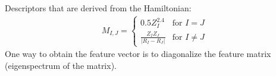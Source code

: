 Descriptors that are derived from the Hamiltonian:
\begin{align*}
M_{I,J} = 
\begin{cases}
0.5Z_{I}^{2.4}& \text{for } I = J \\
\frac{Z_{I}Z_{J}}{|R_I-R_J|}&  \text{for } I \neq J
\end{cases}
\end{align*}
One way to obtain the feature vector is to diagonalize the feature matrix (eigenspectrum of the matrix). 